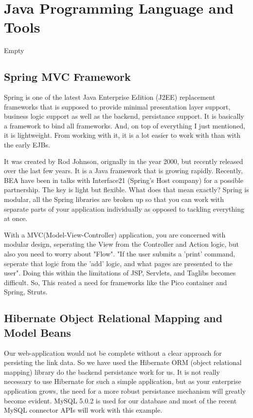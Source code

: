\section{Java Programming Language and Tools}

Empty

\subsection{Spring MVC Framework}
Spring is one of the latest Java Enterprise Edition (J2EE) replacement 
frameworks that is supposed to provide minimal presentation layer support, 
business logic support as well as the backend, persistance support. 
It is basically a framework to bind all frameworks. And, on top 
of everything I just mentioned, it is lightweight. 
From working with it, it is a lot easier to work with than with the early EJBs.

It was created by Rod Johnson, orignally in the year 2000, but recently released over the last few years.
It is a Java framework that is growing rapidly. Recently, BEA have been in talks with
Interface21 (Spring's Host company) for a possible partnership. The key is light but flexible. What does
that mean exactly? Spring is modular, all the Spring libraries are broken up so that you can work with
separate parts of your application individually as opposed to tackling everything at once.

With a MVC(Model-View-Controller) application, you are concerned with modular design,
seperating the View from the Controller and Action logic, but also you need to worry about "Flow". "If
the user submits a 'print' command, seperate that logic from the 'add' logic, and what pages are
presented to the user". Doing this within the limitations of JSP, Servlets, and Taglibs becomes difficult.
So, This reated a need for frameworks like the Pico container and Spring, Struts. 

\subsection{Hibernate Object Relational Mapping and Model Beans}

Our web-application would not be complete without a clear approach 
for persisting the link data. So we have used the Hibernate ORM 
(object relational mapping) library do the backend persistance work for us. 
It is not really necessary to use Hibernate for such a simple 
application, but as your enterprise application grows, 
the need for a more robust persistance mechanism will greatly become evident. 
MySQL 5.0.2 is used for our database and most of the recent 
MySQL connector APIs will work with this example.

